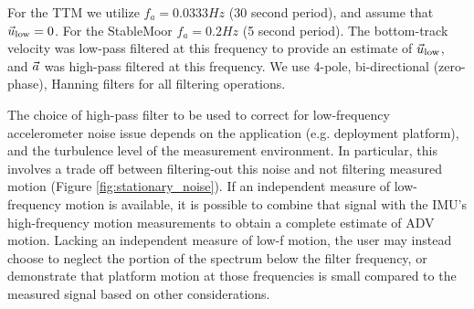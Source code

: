 For the TTM we utilize $f_a = 0.0333 Hz$ (30 second period), and assume that $\vec{u}_\mathrm{low} = 0$. For the StableMoor $f_a = 0.2 Hz$ (5 second period). The bottom-track velocity was  low-pass filtered at this frequency to provide an estimate of $\vec{u}_\mathrm{low}$, and ${\vec{a}}$ was high-pass filtered at this frequency. We use 4-pole, bi-directional (zero-phase), Hanning filters for all filtering operations. 




The choice of high-pass filter to be used to correct for low-frequency accelerometer noise issue depends on the application (e.g. deployment platform), and the turbulence level of the measurement environment. In particular, this involves a trade off between filtering-out this noise and not filtering measured motion (Figure \ref{fig:stationary_noise}). If an independent measure of low-frequency motion is available, it is possible to combine that signal with the IMU's high-frequency motion measurements to obtain a complete estimate of ADV motion. Lacking an independent measure of low-f motion, the user may instead choose to neglect the portion of the spectrum below the filter frequency, or demonstrate that platform motion at those frequencies is small compared to the measured signal based on other considerations. 

